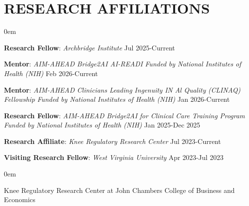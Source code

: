\section*{RESEARCH AFFILIATIONS}
\begin{list1}
\itemsep0em
\item[] \textbf{Research Fellow}: \textit{Archbridge Institute} \hfill Jul 2025-Current
\item[] \textbf{Mentor}: \textit{AIM-AHEAD Bridge2AI AI-READI Funded by National Institutes of Health (NIH)} \hfill Feb 2026-Current
\item[] \textbf{Mentor}: \textit{AIM-AHEAD Clinicians Leading Ingenuity IN Al Quality (CLINAQ) Fellowship Funded by National Institutes of Health (NIH)} \hfill Jan 2026-Current

\item[] \textbf{Research Fellow}: \textit{AIM-AHEAD Bridge2AI for Clinical Care Training Program Funded by National Institutes of Health (NIH)} \hfill Jan 2025-Dec 2025
\item[] \textbf{Research Affiliate}: \textit{Knee Regulatory Research Center} \hfill Jul 2023-Current
\item[] \textbf{Visiting Research Fellow}: \textit{West Virginia University} \hfill Apr 2023-Jul 2023
\begin{list1}
\itemsep0em
\item[] Knee Regulatory Research Center at John Chambers College of Business and Economics 
\end{list1}
\end{list1}

